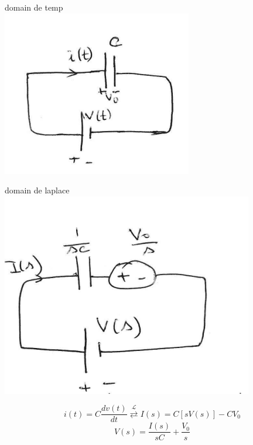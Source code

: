 \documentclass[12pt]{book}
\newcommand{\lagrange}{\mathcal{L}}
\begin{document}
                \begin{center}
                    \begin{minipage}{0,49\linewidth}
                        domain de temp \\
                        \includegraphics[width=\linewidth]{pic/condonsateur1.png}
                    \end{minipage}
                    \begin{minipage}{0,49\linewidth}
                        domain de laplace \\
                        \includegraphics[width=\linewidth]{pic/condonsateur2.png}
                    \end{minipage}
                    $$ i(t)=C\frac{dv(t)}{dt} \overset{\lagrange}{\rightleftarrows}I(s) = C[sV(s)] -CV_0 $$ 
                    $$ V(s) = \frac{I(s)}{sC}+\frac{V_0}{s} $$
                \end{center} 
\end{document}
